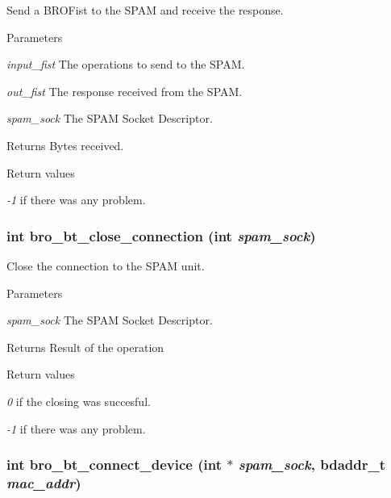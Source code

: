 Send a BROFist to the SPAM and receive the response. 


\begin{DoxyParams}{Parameters}
\item[{\em input\_\-fist}]The operations to send to the SPAM. \item[{\em out\_\-fist}]The response received from the SPAM. \item[{\em spam\_\-sock}]The SPAM Socket Descriptor. \end{DoxyParams}
\begin{DoxyReturn}{Returns}
Bytes received. 
\end{DoxyReturn}

\begin{DoxyRetVals}{Return values}
\item[{\em -\/1}]if there was any problem. \end{DoxyRetVals}
\hypertarget{group___bro_b_t_ga7e4a6289129f5f2a9d3c87619629dac8}{
\subsubsection[{bro\_\-bt\_\-close\_\-connection}]{\setlength{\rightskip}{0pt plus 5cm}int bro\_\-bt\_\-close\_\-connection (int {\em spam\_\-sock})}}
\label{group___bro_b_t_ga7e4a6289129f5f2a9d3c87619629dac8}


Close the connection to the SPAM unit. 


\begin{DoxyParams}{Parameters}
\item[{\em spam\_\-sock}]The SPAM Socket Descriptor. \end{DoxyParams}
\begin{DoxyReturn}{Returns}
Result of the operation 
\end{DoxyReturn}

\begin{DoxyRetVals}{Return values}
\item[{\em 0}]if the closing was succesful. \item[{\em -\/1}]if there was any problem. \end{DoxyRetVals}
\hypertarget{group___bro_b_t_ga3782811f033f57a69b10be399da70207}{
\subsubsection[{bro\_\-bt\_\-connect\_\-device}]{\setlength{\rightskip}{0pt plus 5cm}int bro\_\-bt\_\-connect\_\-device (int $\ast$ {\em spam\_\-sock}, \/  bdaddr\_\-t {\em mac\_\-addr})}}
\label{group___bro_b_t_ga3782811f033f57a69b10be399da70207}


